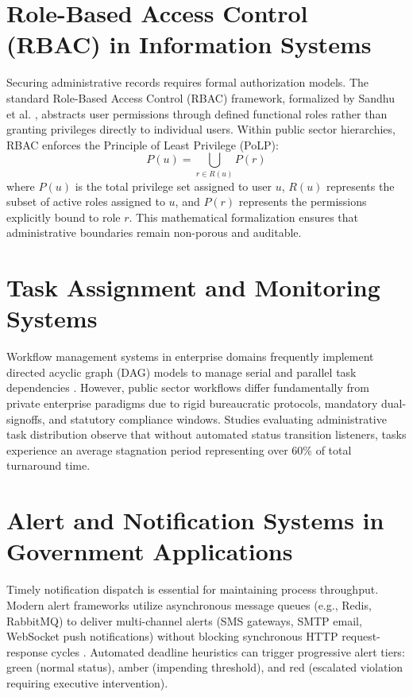 \section{Role-Based Access Control (RBAC) in Information Systems}
\label{sec:rbac_in_is}
Securing administrative records requires formal authorization models. The standard Role-Based Access Control (RBAC) framework, formalized by Sandhu et al. \cite{sandhu1996role}, abstracts user permissions through defined functional roles rather than granting privileges directly to individual users. Within public sector hierarchies, RBAC enforces the Principle of Least Privilege (PoLP):
\begin{equation}
    P(u) = \bigcup_{r \in R(u)} P(r)
\end{equation}
where $P(u)$ is the total privilege set assigned to user $u$, $R(u)$ represents the subset of active roles assigned to $u$, and $P(r)$ represents the permissions explicitly bound to role $r$. This mathematical formalization ensures that administrative boundaries remain non-porous and auditable.

\section{Task Assignment and Monitoring Systems}
\label{sec:task_monitoring}
Workflow management systems in enterprise domains frequently implement directed acyclic graph (DAG) models to manage serial and parallel task dependencies \cite{aalst2004workflow}. However, public sector workflows differ fundamentally from private enterprise paradigms due to rigid bureaucratic protocols, mandatory dual-signoffs, and statutory compliance windows. Studies evaluating administrative task distribution observe that without automated status transition listeners, tasks experience an average stagnation period representing over 60\% of total turnaround time.

\section{Alert and Notification Systems in Government Applications}
\label{sec:alert_systems}
Timely notification dispatch is essential for maintaining process throughput. Modern alert frameworks utilize asynchronous message queues (e.g., Redis, RabbitMQ) to deliver multi-channel alerts (SMS gateways, SMTP email, WebSocket push notifications) without blocking synchronous HTTP request-response cycles \cite{newman2015building}. Automated deadline heuristics can trigger progressive alert tiers: green (normal status), amber (impending threshold), and red (escalated violation requiring executive intervention).

